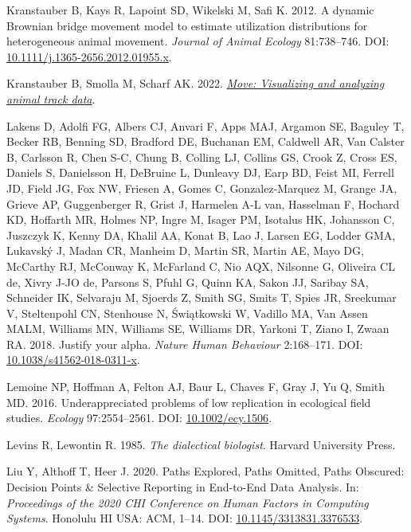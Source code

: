 \documentclass[10pt,a4paper]{article}
\newlength{\cslhangindent}
\newlength{\cslentryspacingunit} %
\newenvironment{CSLReferences}[2] %
 {%
  \setlength{\parindent}{0pt}
  \ifodd #1
  \let\oldpar\par
  \def\par{\hangindent=\cslhangindent\oldpar}
  \fi
  \setlength{\parskip}{#2\cslentryspacingunit}
 }%
 {}
\begin{document}
\begin{CSLReferences}{1}{0}
\leavevmode{}%
Kranstauber B, Kays R, Lapoint SD, Wikelski M, Safi K. 2012. A dynamic {Brownian} bridge movement model to estimate utilization distributions for heterogeneous animal movement. \emph{Journal of Animal Ecology} 81:738--746. DOI: \href{https://doi.org/10.1111/j.1365-2656.2012.01955.x}{10.1111/j.1365-2656.2012.01955.x}.

\leavevmode{}%
Kranstauber B, Smolla M, Scharf AK. 2022. \emph{\href{https://CRAN.R-project.org/package=move}{Move: Visualizing and analyzing animal track data}}.

\leavevmode{}%
Lakens D, Adolfi FG, Albers CJ, Anvari F, Apps MAJ, Argamon SE, Baguley T, Becker RB, Benning SD, Bradford DE, Buchanan EM, Caldwell AR, Van Calster B, Carlsson R, Chen S-C, Chung B, Colling LJ, Collins GS, Crook Z, Cross ES, Daniels S, Danielsson H, DeBruine L, Dunleavy DJ, Earp BD, Feist MI, Ferrell JD, Field JG, Fox NW, Friesen A, Gomes C, Gonzalez-Marquez M, Grange JA, Grieve AP, Guggenberger R, Grist J, Harmelen A-L van, Hasselman F, Hochard KD, Hoffarth MR, Holmes NP, Ingre M, Isager PM, Isotalus HK, Johansson C, Juszczyk K, Kenny DA, Khalil AA, Konat B, Lao J, Larsen EG, Lodder GMA, Lukavský J, Madan CR, Manheim D, Martin SR, Martin AE, Mayo DG, McCarthy RJ, McConway K, McFarland C, Nio AQX, Nilsonne G, Oliveira CL de, Xivry J-JO de, Parsons S, Pfuhl G, Quinn KA, Sakon JJ, Saribay SA, Schneider IK, Selvaraju M, Sjoerds Z, Smith SG, Smits T, Spies JR, Sreekumar V, Steltenpohl CN, Stenhouse N, Świątkowski W, Vadillo MA, Van Assen MALM, Williams MN, Williams SE, Williams DR, Yarkoni T, Ziano I, Zwaan RA. 2018. Justify your alpha. \emph{Nature Human Behaviour} 2:168--171. DOI: \href{https://doi.org/10.1038/s41562-018-0311-x}{10.1038/s41562-018-0311-x}.

\leavevmode{}%
Lemoine NP, Hoffman A, Felton AJ, Baur L, Chaves F, Gray J, Yu Q, Smith MD. 2016. Underappreciated problems of low replication in ecological field studies. \emph{Ecology} 97:2554--2561. DOI: \href{https://doi.org/10.1002/ecy.1506}{10.1002/ecy.1506}.

\leavevmode{}%
Levins R, Lewontin R. 1985. \emph{The dialectical biologist}. Harvard University Press.

\leavevmode{}%
Liu Y, Althoff T, Heer J. 2020. Paths {Explored}, {Paths} {Omitted}, {Paths} {Obscured}: {Decision} {Points} \& {Selective} {Reporting} in {End}-to-{End} {Data} {Analysis}. In: \emph{Proceedings of the 2020 {CHI} {Conference} on {Human} {Factors} in {Computing} {Systems}}. Honolulu HI USA: ACM, 1--14. DOI: \href{https://doi.org/10.1145/3313831.3376533}{10.1145/3313831.3376533}.


\end{CSLReferences}
\end{document}
